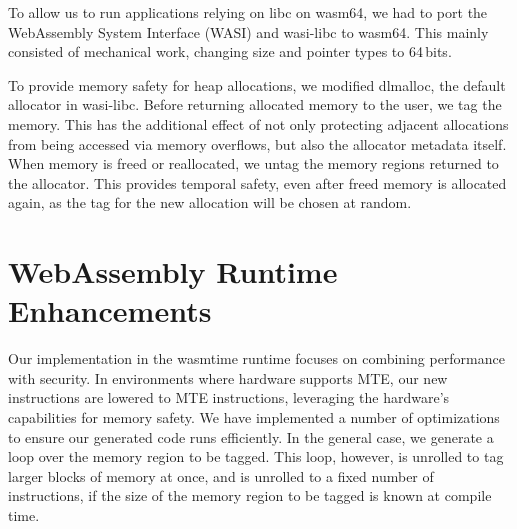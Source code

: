 To allow us to run applications relying on libc on wasm64, we had to port the WebAssembly System Interface (WASI) and wasi-libc to wasm64.
This mainly consisted of mechanical work, changing size and pointer types to 64\,bits.

To provide memory safety for heap allocations, we modified dlmalloc, the default allocator in wasi-libc.
Before returning allocated memory to the user, we tag the memory.
This has the additional effect of not only protecting adjacent allocations from being accessed via memory overflows, but also the allocator metadata itself.
When memory is freed or reallocated, we untag the memory regions returned to the allocator.
This provides temporal safety, even after freed memory is allocated again, as the tag for the new allocation will be chosen at random.

\section{WebAssembly Runtime Enhancements}
\label{sec:wasm-runtime}

Our implementation in the wasmtime runtime focuses on combining performance with security.
In environments where hardware supports MTE, our new instructions are lowered to MTE instructions, leveraging the hardware's capabilities for memory safety.
We have implemented a number of optimizations to ensure our generated code runs efficiently.
In the general case, we generate a loop over the memory region to be tagged.
This loop, however, is unrolled to tag larger blocks of memory at once, and is unrolled to a fixed number of instructions, if the size of the memory region to be tagged is known at compile time.
